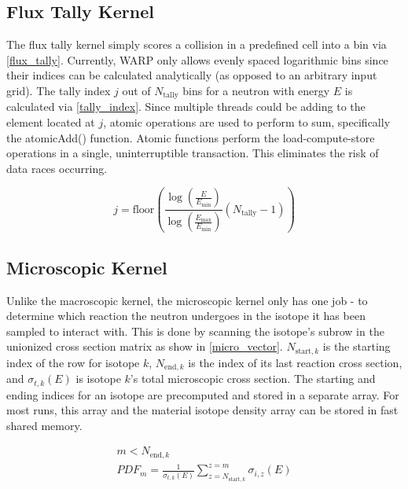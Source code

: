\subsection{Flux Tally Kernel}

The flux tally kernel simply scores a collision in a predefined cell into a bin via \eqref{flux_tally}.  Currently, WARP only allows evenly spaced logarithmic bins since their indices can be calculated analytically (as opposed to an arbitrary input grid).  The tally index $j$ out of $N_\mathrm{tally}$ bins for a neutron with energy $E$ is calculated via \eqref{tally_index}.  Since multiple threads could be adding to the element located at $j$, atomic operations are used to perform to sum, specifically the atomicAdd() function.  Atomic functions perform the load-compute-store operations in a single, uninterruptible transaction.  This eliminates the risk of data races occurring.

\begin{equation}
j = \mathrm{floor} \left( \frac{ \log \left( \frac{E}{E_\mathrm{min}} \right)} { \log \left( \frac{E_\mathrm{max}}{E_\mathrm{min}} \right)} (N_\mathrm{tally}-1) \right)
\label{tally_index}
\end{equation}

\subsection{Microscopic Kernel}

Unlike the macroscopic kernel, the microscopic kernel only has one job - to determine which reaction the neutron undergoes in the isotope it has been sampled to interact with.  This is done by scanning the isotope's subrow in the unionized cross section matrix as show in \eqref{micro_vector}.  $N_{\mathrm{start},k}$ is the starting index of the row for isotope $k$, $N_{\mathrm{end},k}$ is the index of its last reaction cross section, and $\sigma_{t,k}(E)$ is isotope $k$'s total microscopic cross section.  The starting and ending indices for an isotope are precomputed and stored in a separate array.  For most runs, this array and the material isotope density array can be stored in fast shared memory.

\begin{equation}
\begin{gathered}
m <  N_{\mathrm{end},k}\\
 PDF_m = \frac{1}{\sigma_{t,k}(E)} \sum_{z=N_{\mathrm{start},k}}^{z=m}  \sigma_{i,z}(E)
 \end{gathered}
\label{micro_vector}
\end{equation}

